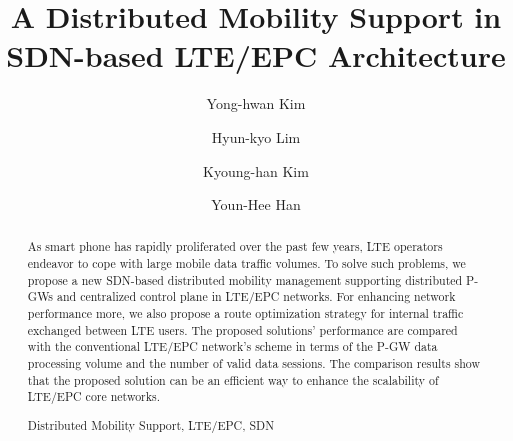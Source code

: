 \documentclass[runningheads,a4paper]{llncs}
\newcommand{\keywords}[1]{\par\addvspace\baselineskip
\noindent\keywordname\enspace\ignorespaces#1}
\begin{document}
\mainmatter  %

\title{A Distributed Mobility Support in SDN-based LTE/EPC Architecture}


%
%

\author{Yong-hwan Kim\inst{}
\and Hyun-kyo Lim\inst{}
\and Kyoung-han Kim\inst{}
\and Youn-Hee Han\inst{}}
%


%
%

\maketitle


\begin{abstract}
As smart phone has rapidly proliferated over the past few years, LTE operators endeavor to cope with large mobile data traffic volumes.  To solve such problems, we propose a new SDN-based distributed mobility management supporting distributed P-GWs and centralized control plane in LTE/EPC networks. For enhancing network performance more, we also propose a route optimization strategy for internal traffic exchanged between LTE users. The proposed solutions' performance are compared with the conventional LTE/EPC network's scheme in terms of the P-GW data processing volume and the number of valid data sessions. The comparison results show that the proposed solution can be an efficient way to enhance the scalability of LTE/EPC core networks.

\keywords{Distributed Mobility Support, LTE/EPC, SDN}
\end{abstract}
\end{document}
